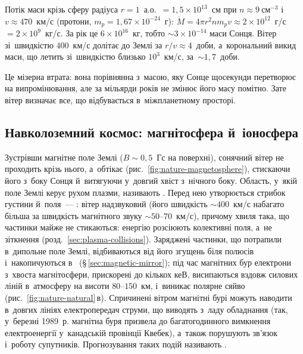 \begin{Estimate}
Потік маси крізь сферу радіуса $r=1$~а.о.\ $=1{,}5\times10^{13}$~см при $n\approx9~\mathrm{см}^{-3}$ і~$v\approx470$~км/с (протони, $m_p=1{,}67\times10^{-24}$~г):
$\dot M=4\pi r^2 n m_p v\approx2\times10^{12}$~г/с~$=2\times10^{9}$~кг/с. За рік це $6\times10^{16}$~кг, тобто $\sim3\times10^{-14}$ маси Сонця.
Вітер зі~швидкістю $400$~км/с долітає до Землі за $r/v\approx4$~доби, а~корональний викид маси, що летить зі~швидкістю близько $10^3$~км/с, за~\mbox{$\sim1{,}7$~доби}.
\end{Estimate}
Це мізерна втрата: вона порівнянна з~масою, яку Сонце щосекунди перетворює на випромінювання, але за мільярди років не змінює його масу помітно.
Зате вітер визначає все, що відбувається в~міжпланетному просторі.

\subsection*{Навколоземний космос: магнітосфера й~іоносфера}

Зустрівши магнітне поле Землі ($B\sim0{,}5$~Гс на поверхні), сонячний вітер не проходить крізь нього, а~обтікає (рис.~\ref{fig:nature-magnetosphere}), стискаючи його з~боку Сонця й~витягуючи у~довгий хвіст
з~нічного боку. Область, у~якій поле Землі керує рухом плазми, називають . Перед нею утворюється стрибок густини й~поля~---
: вітер надзвуковий (його швидкість $\sim400$~км/с набагато більша за швидкість магнітного звуку $\sim50$--$70$~км/с), причому хвиля така, що частинки майже не стикаються: енергію розсіюють колективні поля, а~не зіткнення
(розд.~\ref{sec:plasma-collisions}). Заряджені частинки, що потрапили в~дипольне поле Землі, відбиваються від його згущень біля полюсів і~накопичуються
в~ (§\,\ref{sec:magnetic-mirror}); під час магнітних бур електрони з~хвоста магнітосфери, прискорені до кількох кеВ, висипаються вздовж силових ліній в~атмосферу на висоти
$80$--$150$~км, і~виникає полярне сяйво (рис.~\ref{fig:nature-natural}\,в). Спричинені вітром магнітні бурі можуть наводити в~довгих лініях електропередач струми, що виводять з~ладу обладнання
(так, у~березні 1989~р. магнітна буря призвела до багатогодинного вимкнення електроенергії у~канадській провінції Квебек), а~також порушують зв'язок і~роботу супутників.
Прогнозування таких подій називають .

